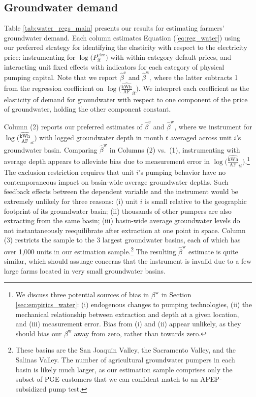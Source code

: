 \subsection{Groundwater demand}

Table \ref{tab:water_regs_main} presents our results for estimating farmers' groundwater demand. Each column estimates Equation (\ref{eq:reg_water}) using our preferred strategy for identifying the elasticity with respect to the electricity price: instrumenting for $\log\big(P_{it}^{\text{elec}}\big)$ with within-category default prices, and interacting unit fixed effects with indicators for each category of physical pumping capital. Note that we report $\hat\beta^{\text{e}}$ and $\hat\beta^{\text{w}}$, where the latter subtracts 1 from the regression coefficient on $\log\big(\widehat{\tfrac{{\text{kWh}}}{\text{AF}}}_{it}\big)$. We interpret each coefficient as the elasticity of demand for groundwater with respect to one component of the price of groundwater, holding the other component constant.

Column (2) reports our preferred estimates of $\hat\beta^{\text{e}}$ and $\hat\beta^{\text{w}}$, where we instrument for $\log\big(\widehat{\tfrac{{\text{kWh}}}{\text{AF}}}_{it}\big)$ with logged groundwater depth in month $t$ averaged across unit $i$'s groundwater basin. Comparing $\hat\beta^{\text{w}}$ in Columns (2) vs.\ (1), instrumenting with average depth appears to alleviate bias due to measurement error in $\log\big(\widehat{\tfrac{{\text{kWh}}}{\text{AF}}}_{it}\big)$.\footnote{
We discuss three potential sources of bias in $\beta^{\text{w}}$ in Section \ref{sec:empirics_water}: (i) endogenous changes to pumping technologies, (ii) the mechanical relationship between extraction and depth at a given location, and (iii) measurement error. Bias from (i) and (ii) appear unlikely, as they should bias our $\beta^{\text{w}}$ away from zero, rather than towards zero.
}
The exclusion restriction requires that unit $i$'s pumping behavior have no contemporaneous impact on basin-wide average groundwater depths. Such feedback effects between the dependent variable and the instrument would be extremely unlikely for three reasons: (i) unit $i$ is small relative to the geographic footprint of its groundwater basin; (ii) thousands of other pumpers are also extracting from the same basin; (iii) basin-wide average groundwater levels do not instantaneously reequilibrate after extraction at one point in space. Column (3) restricts the sample to the 3 largest groundwater basins, each of which has over 1,000 units in our estimation sample.\footnote{These basins are the San Joaquin Valley, the Sacramento Valley, and the Salinas Valley. The number of agricultural groundwater pumpers in each basin is likely much larger, as our estimation sample comprises only the subset of PGE customers that we can confident match to an APEP-subsidized pump test.
}
The resulting $\hat\beta^{\text{w}}$ estimate is quite similar, which should assuage concerns that the instrument is invalid due to a few large farms located in very small groundwater basins.

